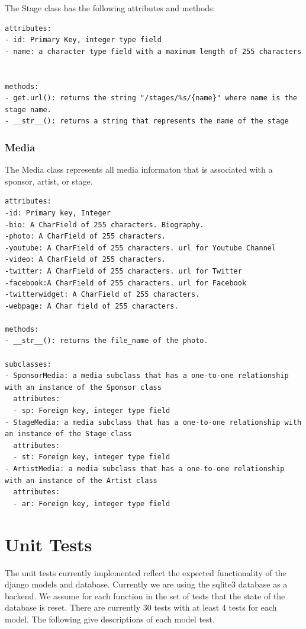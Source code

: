 \documentclass[12pt,english]{scrartcl}
\begin{document}
The Stage class has the following attributes and methods:
\begin{verbatim}
attributes:
- id: Primary Key, integer type field
- name: a character type field with a maximum length of 255 characters


methods:
- get.url(): returns the string "/stages/%s/{name}" where name is the stage name.
- __str__(): returns a string that represents the name of the stage
\end{verbatim}

\subsubsection{Media}
The Media class represents all media informaton that is associated with a sponsor, artist, or stage. 

\begin{verbatim}
attributes:
-id: Primary key, Integer
-bio: A CharField of 255 characters. Biography. 
-photo: A CharField of 255 characters. 
-youtube: A CharField of 255 characters. url for Youtube Channel
-video: A CharField of 255 characters.
-twitter: A CharField of 255 characters. url for Twitter
-facebook:A CharField of 255 characters. url for Facebook
-twitterwidget: A CharField of 255 characters.
-webpage: A Char field of 255 characters.

methods:
- __str__(): returns the file_name of the photo.

subclasses:
- SponsorMedia: a media subclass that has a one-to-one relationship with an instance of the Sponsor class
  attributes:
  - sp: Foreign key, integer type field
- StageMedia: a media subclass that has a one-to-one relationship with an instance of the Stage class
  attributes:
  - st: Foreign key, integer type field
- ArtistMedia: a media subclass that has a one-to-one relationship with an instance of the Artist class
  attributes:
  - ar: Foreign key, integer type field
\end{verbatim}

\section{Unit Tests}
The unit tests currently implemented reflect the expected functionality of the django models and database.
Currently we are using the sqlite3 database as a backend. We assume for each function in the set of tests that the state of the database is reset.
There are currently 30 tests with at least 4 tests for each model. The following give descriptions of each model test. 
\end{document}
